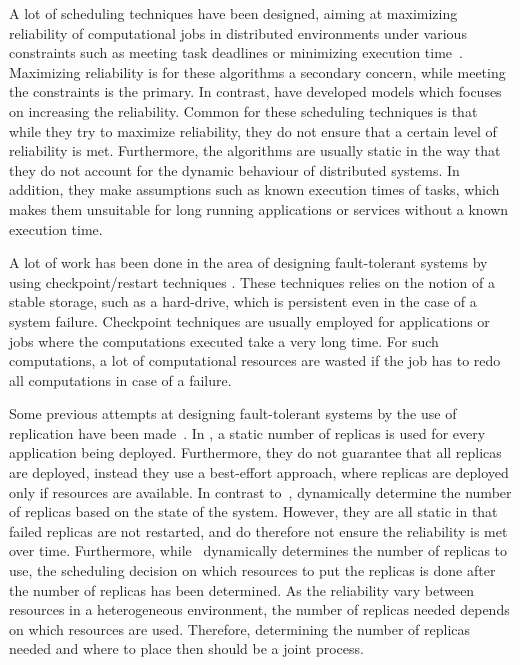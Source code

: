 \documentclass{cslthse-msc}
\begin{document}
A lot of scheduling techniques have been designed, aiming at maximizing reliability of computational jobs in distributed environments under various constraints such as meeting task deadlines or minimizing execution time~\cite{algoOptTimeMaxRel, optTaskAllocationForMaxRel, taskAllocation, taskAllocationSwarm, algoMaxRelEndToEndConstraint, algoMinExTime, schedReplicas}. Maximizing reliability is for these algorithms a secondary concern, while meeting the constraints is the primary. In contrast, \cite{optResourceAllMaxPerformance, matchSchedAlgoMinFailure, safetyRelTaskAllocation, improvedTaskAllMaxRel} have developed models which focuses on increasing the reliability. Common for these scheduling techniques is that while they try to maximize reliability, they do not ensure that a certain level of reliability is met. Furthermore, the algorithms are usually static in the way that they do not account for the dynamic behaviour of distributed systems. In addition, they make assumptions such as known execution times of tasks, which makes them unsuitable for long running applications or services without a known execution time.

A lot of work has been done in the area of designing fault-tolerant systems by using checkpoint/restart techniques \cite{adaptiveCheckPointAndRep, IEEEfaultTolerantSys, faultTolerantDeadlock}. These techniques relies on the notion of a stable storage, such as a hard-drive, which is persistent even in the case of a system failure. Checkpoint techniques are usually employed for applications or jobs where the computations executed take a very long time. For such computations, a lot of computational resources are wasted if the job has to redo all computations in case of a failure.

Some previous attempts at designing fault-tolerant systems by the use of replication have been made~\cite{designFaultTolerantSched, evalReplicationSched, taskSchedulingReplication, effTaskReplMobGrid, relGridServicePredConstraint}. In \cite{evalReplicationSched}, a static number of replicas is used for every application being deployed. Furthermore, they do not guarantee that all replicas are deployed, instead they use a best-effort approach, where replicas are deployed only if resources are available. In contrast to~\cite{evalReplicationSched}, \cite{ effTaskReplMobGrid, taskSchedulingReplication, designFaultTolerantSched} dynamically determine the number of replicas based on the state of the system. However, they are all static in that failed replicas are not restarted, and do therefore not ensure the reliability is met over time. Furthermore, while~\cite{designFaultTolerantSched} dynamically determines the number of replicas to use, the scheduling decision on which resources to put the replicas is done after the number of replicas has been determined. As the reliability vary between resources in a heterogeneous environment, the number of replicas needed depends on which resources are used. Therefore, determining the number of replicas needed and where to place then should be a joint process.
\end{document}
